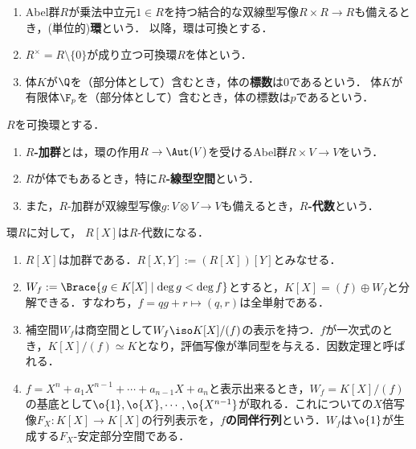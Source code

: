 \documentclass[uplatex, dvipdfmx]{jsreport}
\begin{document}
\begin{definition}\mbox{}
    \begin{enumerate}
        \item Abel群$R$が乗法中立元$1\in R$を持つ結合的な双線型写像$R\times R\to R$も備えるとき，(単位的)\textbf{環}という．
        以降，環は可換とする．
        \item $R^\times=R\setminus\{0\}$が成り立つ可換環$R$を体という．
        \item 体$K$が$\Q$を（部分体として）含むとき，体の\textbf{標数}は$0$であるという．
        体$K$が有限体$\F_p$を（部分体として）含むとき，体の標数は$p$であるという．
    \end{enumerate}
\end{definition}

\begin{definition}
    $R$を可換環とする．
    \begin{enumerate}
        \item \textbf{$R$-加群}とは，環の作用$R\to\Aut(V)$を受けるAbel群$R\times V\to V$をいう．
        \item $R$が体でもあるとき，特に\textbf{$R$-線型空間}という．
        \item また，$R$-加群が双線型写像$g:V\otimes V\to V$も備えるとき，\textbf{$R$-代数}という．
    \end{enumerate}
\end{definition}

\begin{example}[多項式の空間]
    環$R$に対して，
    $R[X]$は$R$-代数になる．
    \begin{enumerate}
        \item $R[X]$は加群である．$R[X,Y]:=(R[X])[Y]$とみなせる．
        \item $W_f:=\Brace{g\in K[X]\mid\deg g< \deg f}$とすると，$K[X]=(f)\oplus W_f$と分解できる．すなわち，$f=qg+r\mapsto(q,r)$は全単射である．
        \item 補空間$W_f$は商空間として$W_f\iso K[X]/(f)$の表示を持つ．$f$が一次式のとき，$K[X]/(f)\simeq K$となり，評価写像が準同型を与える．因数定理と呼ばれる．
        \item $f=X^n+a_1X^{n-1}+\cdots+a_{n-1}X+a_n$と表示出来るとき，$W_f=K[X]/(f)$の基底として$\o{1},\o{X},\cdots,\o{X^{n-1}}$が取れる．これについての$X$倍写像$F_X:K[X]\to K[X]$の行列表示を，\textbf{$f$の同伴行列}という．$W_f$は$\o{1}$が生成する$F_X$-安定部分空間である．
    \end{enumerate}
\end{example}
\end{document}
